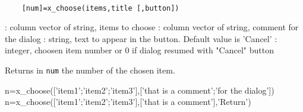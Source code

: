 
\begin{mandesc}
  \\ %
\end{mandesc}
\label{x-choose}
\begin{calling_sequence}
  \begin{verbatim}
    [num]=x_choose(items,title [,button])   
  \end{verbatim}
\end{calling_sequence}
\begin{parameters}
  \begin{varlist}
     : column vector of string,  items to choose
     : column vector of string, comment for the dialog
     :  string, text to appear in the button. Default value is 'Cancel'
     : integer, choosen item number or 0 if dialog resumed with "Cancel" button
  \end{varlist}
\end{parameters}
\begin{mandescription}
  Returns in \verb!num! the number of the chosen item.
\end{mandescription}

\begin{examples}
  \begin{program}
    n=x_choose(['item1';'item2';'item3'],['that is a comment';'for the dialog'])
    n=x_choose(['item1';'item2';'item3'],['that is a comment'],'Return')
  \end{program}
\end{examples}
\begin{manseealso}
\end{manseealso}

